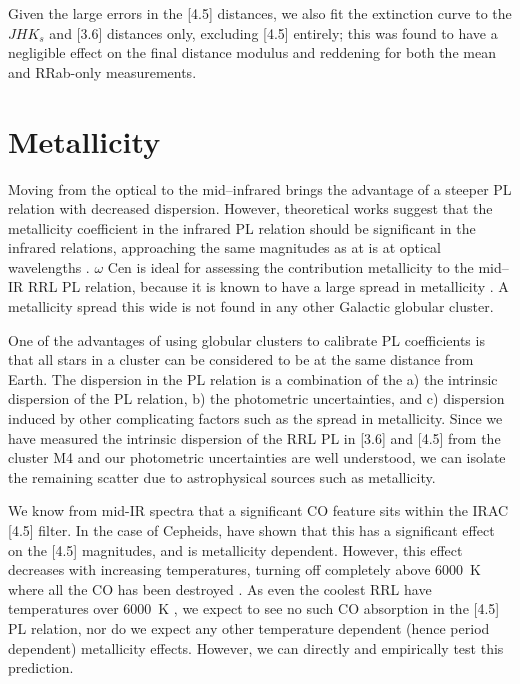 \documentclass[a4paper,fleqn,usenatbib]{mnras}
\begin{document}
Given the large errors in the [4.5] distances, we also fit the extinction curve to the $JHK_s$ and [3.6] distances only, excluding [4.5] entirely; this was found to have a negligible effect on the final distance modulus and reddening for both the mean and RRab-only measurements.

\section{Metallicity}
\label{sec:metallicity}

Moving from the optical to the mid--infrared brings the advantage of a steeper PL relation with decreased dispersion. However, theoretical works suggest that the metallicity coefficient in the infrared PL relation should be significant in the infrared relations, approaching the same magnitudes as at is at optical wavelengths \citep{2001MNRAS.326.1183B, 2004ApJS..154..633C, 2015ApJ...808...50M}. $\omega$ Cen is ideal for assessing the contribution metallicity to the mid--IR RRL PL relation, because it is known to have a large spread in metallicity \citep[$0.8~\leq~\Delta~\text{[Fe/H]}~\leq~1.4$~dex][]{2014ApJ...791..107V, 2012ApJ...746...14M, 2010ApJ...722.1373J}. A metallicity spread this wide is not found in any other Galactic globular cluster. 

One of the advantages of using globular clusters to calibrate PL coefficients is that all stars in a cluster can be considered to be at the same distance from Earth. The dispersion in the PL relation is a combination of the a) the intrinsic dispersion of the PL relation, b) the photometric uncertainties, and c) dispersion induced by other complicating factors such as the spread in metallicity. Since we have measured the intrinsic dispersion of the RRL PL in [3.6] and [4.5] from the cluster M4 \citep{2015ApJ...808...11N} and our photometric uncertainties are well understood, we can isolate the remaining scatter due to astrophysical sources such as metallicity. 

We know from mid-IR spectra that a significant CO feature sits within the IRAC [4.5] filter. In the case of Cepheids, \citet{2016MNRAS.tmp..421S} have shown that this has a significant effect on the [4.5] magnitudes, and is metallicity dependent. However, this effect decreases with increasing temperatures, turning off completely above 6000~K where all the CO has been destroyed \citep{2016MNRAS.tmp..421S}. As even the coolest RRL have temperatures over 6000~K \citep{1971PASP...83..697I}, we expect to see no such CO absorption in the [4.5] PL relation, nor do we expect any other temperature dependent (hence period dependent) metallicity effects. However, we can directly and empirically test this prediction. %
\end{document}
